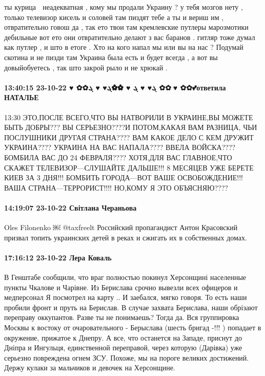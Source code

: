 ты курица 🐔 неадекватная , кому мы продали Украину ? у тебя мозгов нету , только телевизор кисель и соловей там пиздят тебе а ты и вериш им ,
отвратительно говош да , так ето твои там кремлевские путлеры марозмотики дебильные вот ето они отвратительно делают з вас баранов .
гитляр тоже думал как путлер , и што в етоге .
Хто на кого напал мы или вы на нас ?
Подумай скотина и не пизди там
Украина была есть и будет всегда , а вот вы довыйобуетесь , так што закрой рыло и не хрюкай .

\paragraph{13:40:15 23-10-22 ♥ ✿✿ܓ♥ ♥ ܓ ♥ ✿✿ܓ♥ ♥ ܓ ✿✿💋♥ ✿✿💕ответила НАТАЛЬЕ}
13:30
ЭТО,ПОСЛЕ ВСЕГО,ЧТО ВЫ НАТВОРИЛИ В УКРАИНЕ,ВЫ МОЖЕТЕ БЫТЬ ДОБРЫ??? ВЫ
СЕРЬЕЗНО????И ПОТОМ,КАКАЯ ВАМ РАЗНИЦА, ЧЬИ ПОСЛУШНИКИ ДРУГАЯ СТРАНА???? ВАМ
КАКОЕ ДЕЛО С КЕМ ДРУЖИТ УКРАИНА???? УКРАИНА НА ВАС НАПАЛА???? ВВЕЛА ВОЙСКА????
БОМБИЛА ВАС ДО 24 ФЕВРАЛЯ???? ХОТЯ,ДЛЯ ВАС ГЛАВНОЕ,ЧТО СКАЖЕТ
ТЕЛЕВИЗОР---СЛУШАЙТЕ ДАЛЬШЕ!!! 8 МЕСЯЦЕВ УЖЕ БЕРЕТЕ КИЕВ ЗА 3 ДНЯ!!! БОМБИТЬ
ГОРОДА---ВОТ ВАШЕ ОСВОБОЖДЕНИЕ!!! ВАША СТРАНА---ТЕРРОРИСТ!!!! НО,КОМУ Я ЭТО
ОБЪЯСНЯЮ????

\paragraph{14:19:07 23-10-22 Світлана Чераньова}
Oles Filonenko ￼
@taxfreelt
Российский пропагандист Антон Красовский призвал топить украинских детей в реках и сжигать их в собственных домах.

\paragraph{17:16:12 23-10-22 Лера Коваль}

В Генштабе сообщили, что враг полностью покинул Херсонщині населенные пункты Чкалове и Чарівне. Из Берислава срочно вывезли всех офицеров и медперсонал
Я посмотрел на карту .. И заебался, мягко говоря. То есть наши пробили фронт и пруть на Берислав. В случае захвата Берислава, наши обрізают переправу оккупантов.
Разве ты не понимаешь? Тогда да. Вся группировка Москвы к востоку от очаровательного - Берыслава (шесть бригад -!!! ) попадает в окружение, прижатое к Днепру. А все, что останется на Западе, приснут до Дніпра и Ингульця, единственной переправой, через которую (Дарівка) уже серьезно повреждена огнем ЗСУ.
Похоже, мы на пороге великих достижений. Держу кулаки за мальчиков и девочек на Херсонщине.

